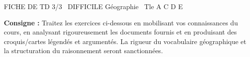 \documentclass[11pt]{article}
\begin{document}
\begin{tcolorbox}[enhanced,colback=popink,colframe=popink,arc=10pt,boxrule=0pt,left=12pt,right=12pt,top=9pt,bottom=9pt]
{\color{white}\popxbold\small FICHE DE TD 3/3 \textbullet\ DIFFICILE \hfill Géographie \textbullet\ Tle A C D E\par}
\end{tcolorbox}
\vspace{4pt}
\noindent \textbf{Consigne :} Traitez les exercices ci-dessous en mobilisant vos connaissances du cours, en analysant rigoureusement les documents fournis et en produisant des croquis/cartes légendés et argumentés. La rigueur du vocabulaire géographique et la structuration du raisonnement seront sanctionnées.
\end{document}
